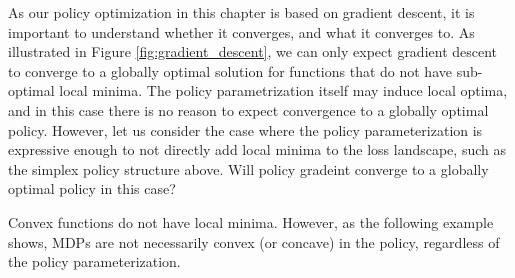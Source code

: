As our policy optimization in this chapter is based on gradient descent, it is important to understand whether it converges, and what it converges to. As illustrated in Figure \ref{fig:gradient_descent}, we can only expect gradient descent to converge to a globally optimal solution for functions that do not have sub-optimal local minima. The policy parametrization itself may induce local optima, and in this case there is no reason to expect convergence to a globally optimal policy. However, let us consider the case where the policy parameterization is expressive enough to not directly add local minima to the loss landscape, such as the simplex policy structure above. Will policy gradeint converge to a globally optimal policy in this case?

Convex functions do not have local minima. However, as the following example shows, MDPs are not necessarily convex (or concave) in the policy, regardless of the policy parameterization.

